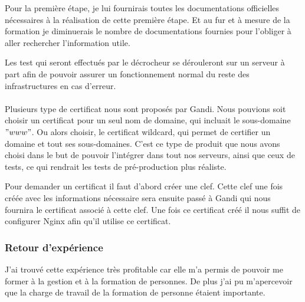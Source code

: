 Pour la première étape, je lui fournirais toutes les documentations officielles nécessaires à la réalisation de cette première étape. Et au fur et à mesure de la formation je diminuerais le nombre de documentations fournies pour l'obliger à aller rechercher l'information utile.

Les test qui seront effectués par le décrocheur se dérouleront sur un serveur à part afin de pouvoir assurer un fonctionnement normal du reste des infrastructures en cas d'erreur.\\\\

Plusieurs type de certificat nous sont proposés par Gandi. Nous pouvions soit choisir un certificat pour un seul nom de domaine, qui incluait le sous-domaine $"www"$. Ou alors choisir, le certificat wildcard, qui permet de certifier un domaine et tout ses sous-domaines. C'est ce type de produit que nous avons choisi dans le but de pouvoir l'intégrer dans tout nos serveurs, ainsi que ceux de tests, ce qui rendrait les tests de pré-production plus réaliste.

Pour demander un certificat il faut d'abord créer une clef. Cette clef une fois créée avec les informations nécessaire sera ensuite passé à Gandi qui nous fournira le certificat associé à cette clef. Une fois ce certificat créé il nous suffit de configurer Nginx afin qu'il utilise ce certificat.

\subsubsection{Retour d'expérience}

J'ai trouvé cette expérience très profitable car elle m'a permis de pouvoir me former à la gestion et à la formation de personnes. De plus j'ai pu m’apercevoir que la charge de travail de la formation de personne étaient importante.
